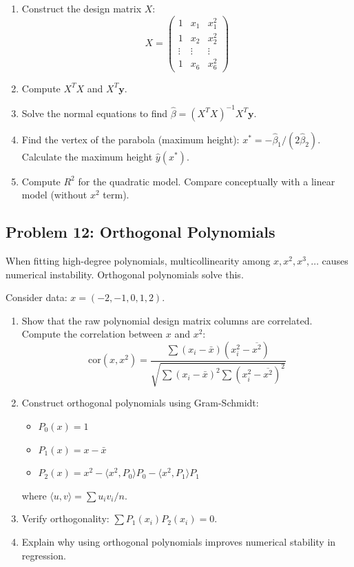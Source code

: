 \documentclass[12pt]{article}
\begin{document}
\begin{enumerate}[label=(\alph*)]
\item Construct the design matrix \(X\):
\[
X = \begin{pmatrix}
1 & x_1 & x_1^2 \\
1 & x_2 & x_2^2 \\
\vdots & \vdots & \vdots \\
1 & x_6 & x_6^2
\end{pmatrix}
\]

\item Compute \(X^TX\) and \(X^T\mathbf{y}\).

\item Solve the normal equations to find \(\hat{\beta} = (X^TX)^{-1}X^T\mathbf{y}\).

\item Find the vertex of the parabola (maximum height): \(x^* = -\hat{\beta}_1/(2\hat{\beta}_2)\). Calculate the maximum height \(\hat{y}(x^*)\).

\item Compute \(R^2\) for the quadratic model. Compare conceptually with a linear model (without \(x^2\) term).
\end{enumerate}

\subsection*{Problem 12: Orthogonal Polynomials}

When fitting high-degree polynomials, multicollinearity among \(x, x^2, x^3, \ldots\) causes numerical instability. Orthogonal polynomials solve this.

Consider data: \(x = (-2, -1, 0, 1, 2)\).

\begin{enumerate}[label=(\alph*)]
\item Show that the raw polynomial design matrix columns are correlated. Compute the correlation between \(x\) and \(x^2\):
\[
\text{cor}(x, x^2) = \frac{\sum(x_i - \bar{x})(x_i^2 - \overline{x^2})}{\sqrt{\sum(x_i - \bar{x})^2 \sum(x_i^2 - \overline{x^2})^2}}
\]

\item Construct orthogonal polynomials using Gram-Schmidt:
\begin{itemize}
\item \(P_0(x) = 1\)
\item \(P_1(x) = x - \bar{x}\)
\item \(P_2(x) = x^2 - \langle x^2, P_0 \rangle P_0 - \langle x^2, P_1 \rangle P_1\)
\end{itemize}
where \(\langle u, v \rangle = \sum u_i v_i / n\).

\item Verify orthogonality: \(\sum P_1(x_i) P_2(x_i) = 0\).

\item Explain why using orthogonal polynomials improves numerical stability in regression.
\end{enumerate}
\end{document}
